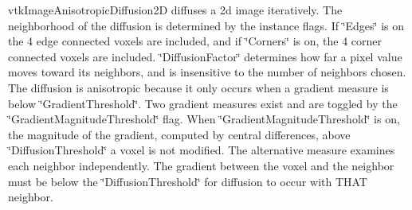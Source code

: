 vtk\-Image\-Anisotropic\-Diffusion2\-D diffuses a 2d image iteratively. The neighborhood of the diffusion is determined by the instance flags. If \char`\"{}\-Edges\char`\"{} is on the 4 edge connected voxels are included, and if \char`\"{}\-Corners\char`\"{} is on, the 4 corner connected voxels are included. \char`\"{}\-Diffusion\-Factor\char`\"{} determines how far a pixel value moves toward its neighbors, and is insensitive to the number of neighbors chosen. The diffusion is anisotropic because it only occurs when a gradient measure is below \char`\"{}\-Gradient\-Threshold\char`\"{}. Two gradient measures exist and are toggled by the \char`\"{}\-Gradient\-Magnitude\-Threshold\char`\"{} flag. When \char`\"{}\-Gradient\-Magnitude\-Threshold\char`\"{} is on, the magnitude of the gradient, computed by central differences, above \char`\"{}\-Diffusion\-Threshold\char`\"{} a voxel is not modified. The alternative measure examines each neighbor independently. The gradient between the voxel and the neighbor must be below the \char`\"{}\-Diffusion\-Threshold\char`\"{} for diffusion to occur with T\-H\-A\-T neighbor.

